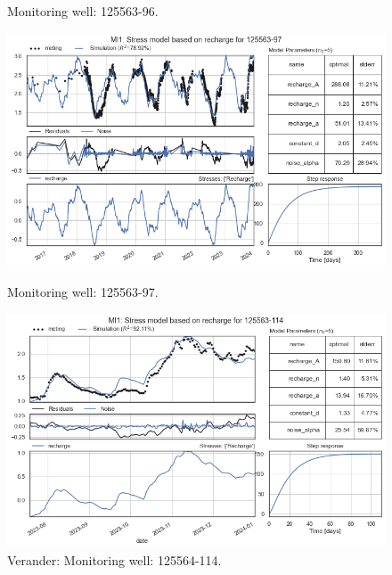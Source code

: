 \begin{figure}[htbp]
\begin{minipage}{0.32\textwidth}
        \caption{Monitoring well: 125563-96.}
        \label{SM: 125563-96}
    \end{minipage}
\end{figure}

\begin{figure}[htbp]
    \centering
    \begin{minipage}{0.32\textwidth}
        \centering
        \includegraphics[width=\linewidth]{frontmatter/Heijplaat-fig/7.png}
        \caption{Monitoring well: 125563-97.}
        \label{SM: 125563-97}
    \end{minipage}
    \hfill
    \begin{minipage}{0.32\textwidth}
        \centering
        \includegraphics[width=\linewidth]{frontmatter/Heijplaat-fig/ml125563114.png}
        \caption{Verander: Monitoring well: 125564-114.}
        \label{SM: 125564-3}
    \end{minipage}
    \hfill
    \begin{minipage}{0.32\textwidth}

\end{minipage}
\end{figure}
